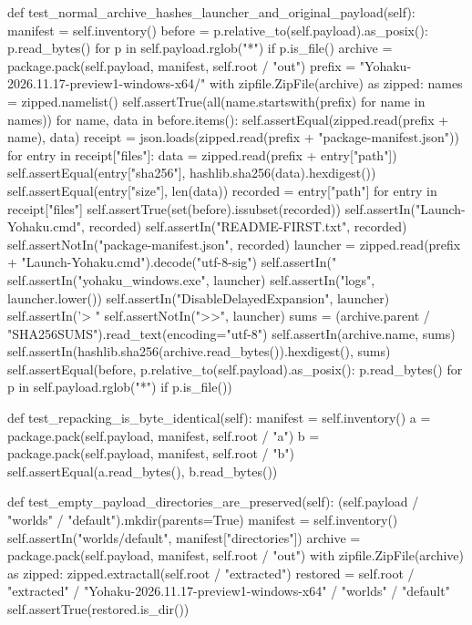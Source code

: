     def test_normal_archive_hashes_launcher_and_original_payload(self):
        manifest = self.inventory()
        before = {p.relative_to(self.payload).as_posix(): p.read_bytes()
                  for p in self.payload.rglob("*") if p.is_file()}
        archive = package.pack(self.payload, manifest, self.root / "out")
        prefix = "Yohaku-2026.11.17-preview1-windows-x64/"
        with zipfile.ZipFile(archive) as zipped:
            names = zipped.namelist()
            self.assertTrue(all(name.startswith(prefix) for name in names))
            for name, data in before.items():
                self.assertEqual(zipped.read(prefix + name), data)
            receipt = json.loads(zipped.read(prefix + "package-manifest.json"))
            for entry in receipt["files"]:
                data = zipped.read(prefix + entry["path"])
                self.assertEqual(entry["sha256"], hashlib.sha256(data).hexdigest())
                self.assertEqual(entry["size"], len(data))
            recorded = {entry["path"] for entry in receipt["files"]}
            self.assertTrue(set(before).issubset(recorded))
            self.assertIn("Launch-Yohaku.cmd", recorded)
            self.assertIn("README-FIRST.txt", recorded)
            self.assertNotIn("package-manifest.json", recorded)
            launcher = zipped.read(prefix + "Launch-Yohaku.cmd").decode("utf-8-sig")
            self.assertIn("%
            self.assertIn("yohaku_windows.exe", launcher)
            self.assertIn("logs", launcher.lower())
            self.assertIn("DisableDelayedExpansion", launcher)
            self.assertIn('> "%
            self.assertNotIn(">>", launcher)
        sums = (archive.parent / "SHA256SUMS").read_text(encoding="utf-8")
        self.assertIn(archive.name, sums)
        self.assertIn(hashlib.sha256(archive.read_bytes()).hexdigest(), sums)
        self.assertEqual(before, {p.relative_to(self.payload).as_posix(): p.read_bytes()
                                  for p in self.payload.rglob("*") if p.is_file()})

    def test_repacking_is_byte_identical(self):
        manifest = self.inventory()
        a = package.pack(self.payload, manifest, self.root / "a")
        b = package.pack(self.payload, manifest, self.root / "b")
        self.assertEqual(a.read_bytes(), b.read_bytes())

    def test_empty_payload_directories_are_preserved(self):
        (self.payload / "worlds" / "default").mkdir(parents=True)
        manifest = self.inventory()
        self.assertIn("worlds/default", manifest["directories"])
        archive = package.pack(self.payload, manifest, self.root / "out")
        with zipfile.ZipFile(archive) as zipped:
            zipped.extractall(self.root / "extracted")
        restored = self.root / "extracted" / "Yohaku-2026.11.17-preview1-windows-x64" / "worlds" / "default"
        self.assertTrue(restored.is_dir())

